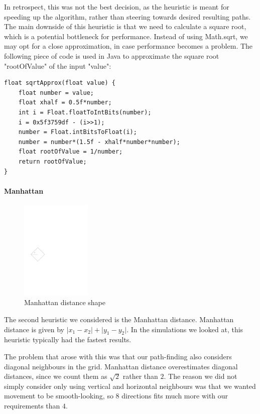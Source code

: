 In retrospect, this was not the best decision, as the heuristic is meant for speeding up the algorithm, rather than steering towards desired resulting paths. The main downside of this heuristic is that we need to calculate a square root, which is a potential bottleneck for performance. Instead of using Math.sqrt, we may opt for a close approximation, in case performance becomes a problem. The following piece of code is used in Java to approximate the square root "rootOfValue" of the input "value":
\begin{lstlisting}
float sqrtApprox(float value) {
	float number = value;
	float xhalf = 0.5f*number;
	int i = Float.floatToIntBits(number);
	i = 0x5f3759df - (i>>1);
	number = Float.intBitsToFloat(i);
	number = number*(1.5f - xhalf*number*number);
	float rootOfValue = 1/number;
	return rootOfValue;
}
\end{lstlisting}

\clearpage
\paragraph{Manhattan}
\begin{figure}
\includegraphics[width=0.30\textwidth]{images/manhattan_unit.pdf}
\caption{Manhattan distance shape}
\end{figure}
The second heuristic we considered is the Manhattan distance. Manhattan distance is given by $\lvert x_1 - x_2 \rvert + \lvert y_1 - y_2 \rvert$. In the simulations we looked at, this heuristic typically had the fastest results. 

The problem that arose with this was that our path-finding also considers diagonal neighbours in the grid. Manhattan distance overestimates diagonal distances, since we count them as $\sqrt{2}$ rather than $2$. The reason we did not simply consider only using vertical and horizontal neighbours was that we wanted movement to be smooth-looking, so $8$ directions fits much more with our requirements than $4$.

